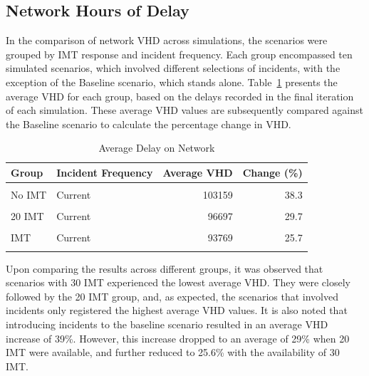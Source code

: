 \documentclass[fancy, oneside, mastersfancy, ms]{byuthesis}
\begin{document}
\hypertarget{network-hours-of-delay}{%
\subsection{Network Hours of Delay}\label{network-hours-of-delay}}

In the comparison of network VHD across simulations, the scenarios were
grouped by IMT response and incident frequency. Each group encompassed
ten simulated scenarios, which involved different selections of
incidents, with the exception of the Baseline scenario, which stands
alone. Table~\ref{tbl-network_delays_table} presents the average VHD for
each group, based on the delays recorded in the final iteration of each
simulation. These average VHD values are subsequently compared against
the Baseline scenario to calculate the percentage change in VHD.

\hypertarget{tbl-network_delays_table}{}
\begin{table}
\caption{\label{tbl-network_delays_table}Average Delay on Network }\tabularnewline

\centering
\begin{tabular}[t]{llrr}
\toprule
\textbf{Group} & \textbf{Incident Frequency} & \textbf{Average VHD} & \textbf{Change (\%)}\\
\midrule
\cellcolor{gray!6}{Baseline} & \cellcolor{gray!6}{-} & \cellcolor{gray!6}{74568} & \cellcolor{gray!6}{0.0}\\
No IMT & Current & 103159 & 38.3\\
\cellcolor{gray!6}{No IMT} & \cellcolor{gray!6}{Increased} & \cellcolor{gray!6}{104178} & \cellcolor{gray!6}{39.7}\\
20 IMT & Current & 96697 & 29.7\\
\cellcolor{gray!6}{20 IMT} & \cellcolor{gray!6}{Increased} & \cellcolor{gray!6}{95678} & \cellcolor{gray!6}{28.3}\\
\addlinespace
30 IMT & Current & 93769 & 25.7\\
\cellcolor{gray!6}{30 IMT} & \cellcolor{gray!6}{Increased} & \cellcolor{gray!6}{93560} & \cellcolor{gray!6}{25.5}\\
\bottomrule
\end{tabular}
\end{table}

Upon comparing the results across different groups, it was observed that
scenarios with 30 IMT experienced the lowest average VHD. They were
closely followed by the 20 IMT group, and, as expected, the scenarios
that involved incidents only registered the highest average VHD values.
It is also noted that introducing incidents to the baseline scenario
resulted in an average VHD increase of 39\%. However, this increase
dropped to an average of 29\% when 20 IMT were available, and further
reduced to 25.6\% with the availability of 30 IMT.
\end{document}
